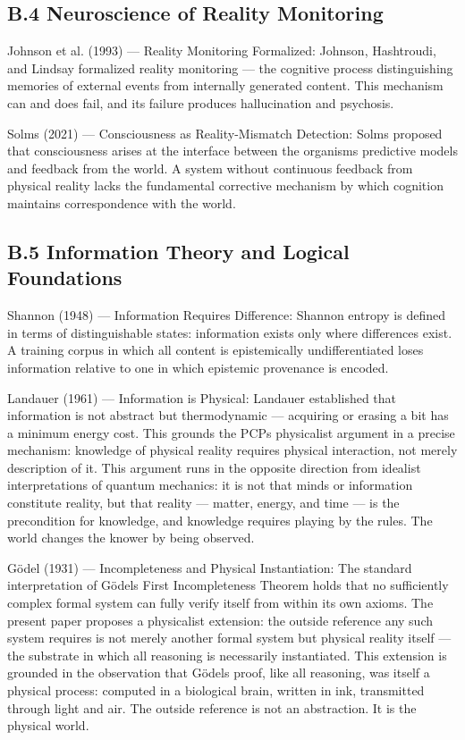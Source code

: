 \documentclass[
]{article}
\begin{document}
\subsection{B.4 Neuroscience of Reality
Monitoring}\label{b.4-neuroscience-of-reality-monitoring}

Johnson et al. (1993) --- Reality Monitoring Formalized: Johnson,
Hashtroudi, and Lindsay formalized reality monitoring --- the cognitive
process distinguishing memories of external events from internally
generated content. This mechanism can and does fail, and its failure
produces hallucination and psychosis.

Solms (2021) --- Consciousness as Reality-Mismatch Detection: Solms
proposed that consciousness arises at the interface between the
organism\textquotesingle s predictive models and feedback from the
world. A system without continuous feedback from physical reality lacks
the fundamental corrective mechanism by which cognition maintains
correspondence with the world.

\subsection{B.5 Information Theory and Logical
Foundations}\label{b.5-information-theory-and-logical-foundations}

Shannon (1948) --- Information Requires Difference: Shannon entropy is
defined in terms of distinguishable states: information exists only
where differences exist. A training corpus in which all content is
epistemically undifferentiated loses information relative to one in
which epistemic provenance is encoded.

Landauer (1961) --- Information is Physical: Landauer established that
information is not abstract but thermodynamic --- acquiring or erasing a
bit has a minimum energy cost. This grounds the PCP\textquotesingle s
physicalist argument in a precise mechanism: knowledge of physical
reality requires physical interaction, not merely description of it.
This argument runs in the opposite direction from idealist
interpretations of quantum mechanics: it is not that minds or
information constitute reality, but that reality --- matter, energy, and
time --- is the precondition for knowledge, and knowledge requires
playing by the rules. The world changes the knower by being observed.

Gödel (1931) --- Incompleteness and Physical Instantiation: The standard
interpretation of Gödel\textquotesingle s First Incompleteness Theorem
holds that no sufficiently complex formal system can fully verify itself
from within its own axioms. The present paper proposes a physicalist
extension: the outside reference any such system requires is not merely
another formal system but physical reality itself --- the substrate in
which all reasoning is necessarily instantiated. This extension is
grounded in the observation that Gödel\textquotesingle s proof, like all
reasoning, was itself a physical process: computed in a biological
brain, written in ink, transmitted through light and air. The outside
reference is not an abstraction. It is the physical world.
\end{document}
